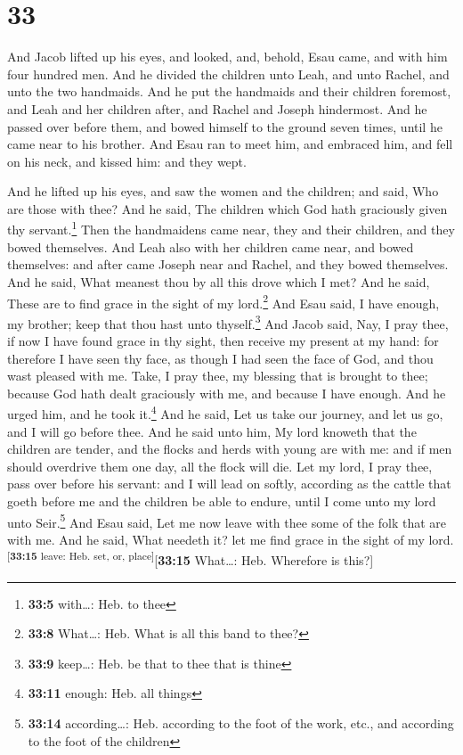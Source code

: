 \hypertarget{section-32}{%
\section{33}\label{section-32}}

 And Jacob lifted up his eyes, and looked, and, behold,
Esau came, and with him four hundred men. And he divided the children
unto Leah, and unto Rachel, and unto the two handmaids. 
And he put the handmaids and their children foremost, and Leah and her
children after, and Rachel and Joseph hindermost.  And he
passed over before them, and bowed himself to the ground seven times,
until he came near to his brother.  And Esau ran to meet
him, and embraced him, and fell on his neck, and kissed him: and they
wept.

 And he lifted up his eyes, and saw the women and the
children; and said, Who are those with thee? And he said, The children
which God hath graciously given thy servant.\footnote{\textbf{33:5}
  with\ldots: Heb. to thee}  Then the handmaidens came
near, they and their children, and they bowed themselves. 
And Leah also with her children came near, and bowed themselves: and
after came Joseph near and Rachel, and they bowed themselves.
 And he said, What meanest thou by all this drove which I
met? And he said, These are to find grace in the sight of my
lord.\footnote{\textbf{33:8} What\ldots: Heb. What is all this band to
  thee?}  And Esau said, I have enough, my brother; keep
that thou hast unto thyself.\footnote{\textbf{33:9} keep\ldots: Heb. be
  that to thee that is thine}  And Jacob said, Nay, I
pray thee, if now I have found grace in thy sight, then receive my
present at my hand: for therefore I have seen thy face, as though I had
seen the face of God, and thou wast pleased with me. 
Take, I pray thee, my blessing that is brought to thee; because God hath
dealt graciously with me, and because I have enough. And he urged him,
and he took it.\footnote{\textbf{33:11} enough: Heb. all things}
 And he said, Let us take our journey, and let us go, and
I will go before thee.  And he said unto him, My lord
knoweth that the children are tender, and the flocks and herds with
young are with me: and if men should overdrive them one day, all the
flock will die.  Let my lord, I pray thee, pass over
before his servant: and I will lead on softly, according as the cattle
that goeth before me and the children be able to endure, until I come
unto my lord unto Seir.\footnote{\textbf{33:14} according\ldots: Heb.
  according to the foot of the work, etc., and according to the foot of
  the children}  And Esau said, Let me now leave with
thee some of the folk that are with me. And he said, What needeth it?
let me find grace in the sight of my
lord.\textsuperscript{{[}\textbf{33:15} leave: Heb. set, or,
place{]}}{[}\textbf{33:15} What\ldots: Heb. Wherefore is this?{]}

